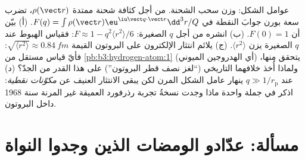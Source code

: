 \begin{exercise}[$\star\star\star$]\label{exo:b3:scattering-theory:12}
عوامل الشكل: وزن سحب الشحنة. من أجل كثافة شحنة
ممتدة $\rho(\vect r)$، تضرب سعة بورن جوابَ النقطة
في $F(q) = \int\rho(\vect r)\eu^{\iu\vect q\cdot\vect r}
\dd^3r/Q$. (أ) بيّن أن $F(0) = 1$. (ب) انشره من أجل $q$ الصغيرة: $F
\approx 1 - q^2\langle r^2\rangle/6$: فقياس الهبوط عند $q$
الصغيرة يزن $\langle r^2\rangle$. (ج) يلائم انتثار
الإلكترون على البروتون القيمة $\sqrt{\langle r^2\rangle} \approx \qty{0.84}{fm}$:
فأيّ قياس مستقل من
\cref{pb:b3:hydrogen-atom:1} (أي الهدروجين الميوني) يتحقق منها،
ولماذا أُخذ خلافهما التاريخي (``لغز نصف قطر البروتون'') على هذا القدر من الجدّ؟ (د)
عند $q \gg 1/r_{\text{p}}$ ينهار عامل الشكل المرن لكن يبقى الانتثار
العنيف عن \emph{مكوّنات نقطية}: اذكر في جملة واحدة ماذا وجدت
نسخةُ تجربة رذرفورد العميقة غير المرنة سنة 1968 داخل
البروتون.
\end{exercise}

\section{مسألة: عدّادو الومضات الذين وجدوا النواة}

